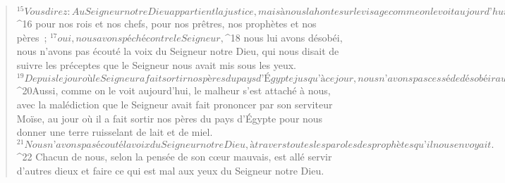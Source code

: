 \begin{verse}
${}^{15}Vous direz :
      Au Seigneur notre Dieu appartient la justice, mais à nous la honte sur le visage comme on le voit aujourd’hui : honte pour l’homme de Juda et les habitants de Jérusalem, 
${}^{16} pour nos rois et nos chefs, pour nos prêtres, nos prophètes et nos pères ; 
${}^{17} oui, nous avons péché contre le Seigneur, 
${}^{18} nous lui avons désobéi, nous n’avons pas écouté la voix du Seigneur notre Dieu, qui nous disait de suivre les préceptes que le Seigneur nous avait mis sous les yeux. 
${}^{19} Depuis le jour où le Seigneur a fait sortir nos pères du pays d’Égypte jusqu’à ce jour, nous n’avons pas cessé de désobéir au Seigneur notre Dieu ; dans notre légèreté, nous n’avons pas écouté sa voix.
${}^{20}Aussi, comme on le voit aujourd’hui, le malheur s’est attaché à nous, avec la malédiction que le Seigneur avait fait prononcer par son serviteur Moïse, au jour où il a fait sortir nos pères du pays d’Égypte pour nous donner une terre ruisselant de lait et de miel. 
${}^{21} Nous n’avons pas écouté la voix du Seigneur notre Dieu, à travers toutes les paroles des prophètes qu’il nous envoyait. 
${}^{22} Chacun de nous, selon la pensée de son cœur mauvais, est allé servir d’autres dieux et faire ce qui est mal aux yeux du Seigneur notre Dieu.
      

\end{verse}
